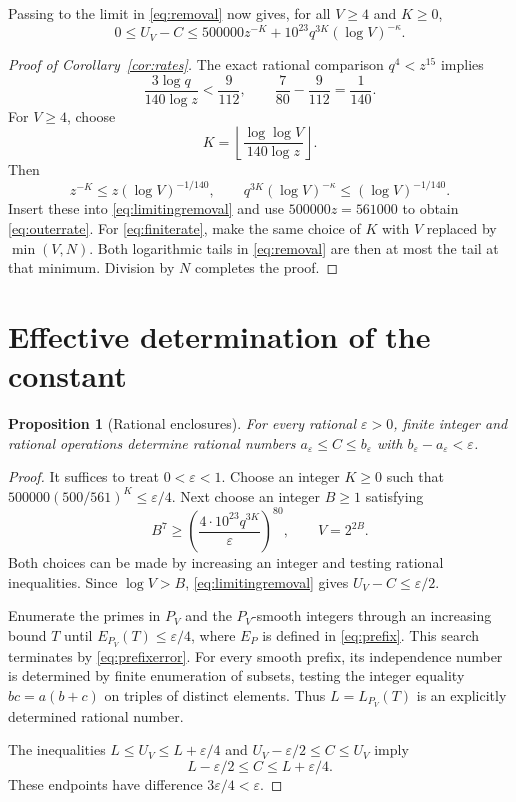 \documentclass[11pt]{amsart}
\newtheorem{proposition}[theorem]{Proposition}
\theoremstyle{definition}
\theoremstyle{remark}
\numberwithin{equation}{section}
\newcommand{\eps}{\varepsilon}
\newcommand{\floor}[1]{\left\lfloor #1\right\rfloor}
\begin{document}
Passing to the limit in \eqref{eq:removal} now gives, for all $V\ge4$ and $K\ge0$,
\begin{equation}\label{eq:limitingremoval}
0\le U_V-C\le500000z^{-K}+10^{23}q^{3K}(\log V)^{-\kappa}.
\end{equation}

\begin{proof}[Proof of Corollary~\ref{cor:rates}]
The exact rational comparison $q^4<z^{15}$ implies
\begin{equation}\label{eq:logcomparison}
\frac{3\log q}{140\log z}<\frac9{112},
\qquad \frac7{80}-\frac9{112}=\frac1{140}.
\end{equation}
For $V\ge4$, choose
\[
K=\floor{\frac{\log\log V}{140\log z}}.
\]
Then
\[
z^{-K}\le z(\log V)^{-1/140},
\qquad
q^{3K}(\log V)^{-\kappa}\le(\log V)^{-1/140}.
\]
Insert these into \eqref{eq:limitingremoval} and use $500000z=561000$ to obtain \eqref{eq:outerrate}.
For \eqref{eq:finiterate}, make the same choice of $K$ with $V$ replaced by $\min(V,N)$.
Both logarithmic tails in \eqref{eq:removal} are then at most the tail at that minimum.
Division by $N$ completes the proof.
\end{proof}

\section{Effective determination of the constant}\label{sec:effective}

\begin{proposition}[Rational enclosures]\label{prop:enclosures}
For every rational $\eps>0$, finite integer and rational operations determine rational numbers $a_\eps\le C\le b_\eps$ with $b_\eps-a_\eps<\eps$.
\end{proposition}

\begin{proof}
It suffices to treat $0<\eps<1$.
Choose an integer $K\ge0$ such that $500000(500/561)^K\le\eps/4$.
Next choose an integer $B\ge1$ satisfying
\[
B^7\ge\left(\frac{4\cdot10^{23}q^{3K}}{\eps}\right)^{80},
\qquad V=2^{2B}.
\]
Both choices can be made by increasing an integer and testing rational inequalities.
Since $\log V>B$, \eqref{eq:limitingremoval} gives $U_V-C\le\eps/2$.

Enumerate the primes in $P_V$ and the $P_V$-smooth integers through an increasing bound $T$ until $E_{P_V}(T)\le\eps/4$, where $E_P$ is defined in \eqref{eq:prefix}.
This search terminates by \eqref{eq:prefixerror}.
For every smooth prefix, its independence number is determined by finite enumeration of subsets, testing the integer equality $bc=a(b+c)$ on triples of distinct elements.
Thus $L=L_{P_V}(T)$ is an explicitly determined rational number.

The inequalities $L\le U_V\le L+\eps/4$ and $U_V-\eps/2\le C\le U_V$ imply
\[
L-\eps/2\le C\le L+\eps/4.
\]
These endpoints have difference $3\eps/4<\eps$.
\end{proof}
\end{document}
